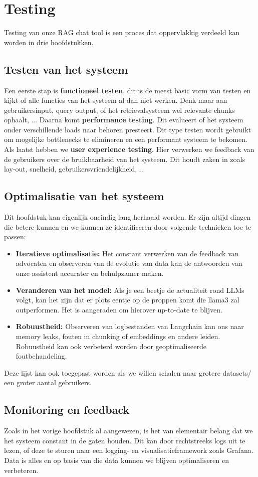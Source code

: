 \chapter{Testing}

Testing van onze RAG chat tool is een proces dat oppervlakkig verdeeld kan worden in drie hoofdstukken. 

\section{Testen van het systeem}
Een eerste stap is \textbf{functioneel testen}, dit is de meest basic vorm van testen en kijkt of alle functies van het systeem al dan niet werken. 
Denk maar aan gebruikersinput, query output, of het retrievalsysteem wel relevante chunks ophaalt, ...
Daarna komt \textbf{performance testing}. Dit evalueert of het systeem onder verschillende loads naar behoren presteert. 
Dit type testen wordt gebruikt om mogelijke bottlenecks te elimineren en een performant systeem te bekomen. 
Als laatst hebben we \textbf{user experience testing}. Hier verwerken we feedback van de gebruikers over de bruikbaarheid van het systeem. 
Dit houdt zaken in zoals lay-out, snelheid, gebruikersvriendelijkheid, ... 

\section{Optimalisatie van het systeem}
Dit hoofdstuk kan eigenlijk oneindig lang herhaald worden. 
Er zijn altijd dingen die betere kunnen en we kunnen ze identificeren door volgende technieken toe te passen:

\begin{itemize}
	\item \textbf{Iteratieve optimalisatie:} Het constant verwerken van de feedback van advocaten en observeren van de evolutie van data kan de antwoorden van onze assistent accurater en behulpzamer maken. 
	\item \textbf{Veranderen van het model:} Als je een beetje de actualiteit rond LLMs volgt, kan het zijn dat er plots eentje op de proppen komt die llama3 zal outperformen. 
		Het is aangeraden om hierover up-to-date te blijven. 
	\item \textbf{Robuustheid:} Observeren van logbestanden van Langchain kan ons naar memory leaks, fouten in chunking of embeddings en andere leiden. 
		Robuustheid kan ook verbeterd worden door geoptimaliseerde foutbehandeling. 
\end{itemize}

Deze lijst kan ook toegepast worden als we willen schalen naar grotere datasets/ een groter aantal gebruikers. 

\section{Monitoring en feedback}
Zoals in het vorige hoofdstuk al aangewezen, is het van elementair belang dat we het systeem constant in de gaten houden. 
Dit kan door rechtstreeks logs uit te lezen, of deze te sturen naar een logging- en visualisatieframework zoals Grafana.
Data is alles en op basis van die data kunnen we blijven optimaliseren en verbeteren. 
